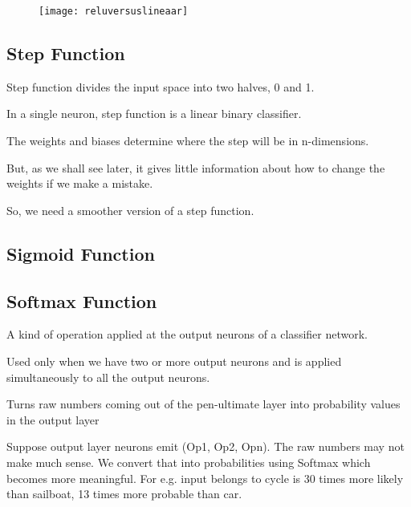  	\begin{figure}[h]
		\centering
		\texttt{[image: reluversuslineaar]}
		\caption{}
		\label{fig:reluversuslineaar}
	\end{figure}


	\subsection{Step Function}
	\begin{bulletedlist}
		\item Step function divides the input space into two halves, 0 and 1.
		\item In a single neuron, step function is a linear binary classifier.
		\item The weights and biases determine where the step will be in n-dimensions.
		\item But, as we shall see later, it gives little information about how to change the weights if we make a mistake.
		\item So, we need a smoother version of a step function.
	\end{bulletedlist}

	\subsection{Sigmoid Function}
	\begin{bulletedlist}
		\item
	\end{bulletedlist}

	\subsection{Softmax Function}
	\begin{bulletedlist}
		\item A kind of operation applied at the output neurons of a classifier network.
		\item Used only when we have two or more output neurons and is applied simultaneously to all the output neurons.
		\item Turns raw numbers coming out of the pen-ultimate layer into probability values in the output layer
		\item Suppose output layer neurons emit (Op1, Op2, Opn). The raw numbers may not make much sense. We convert that into probabilities using Softmax which becomes more meaningful. For e.g. input belongs to cycle is 30 times more likely than sailboat, 13 times more probable than car.
	\end{bulletedlist}

